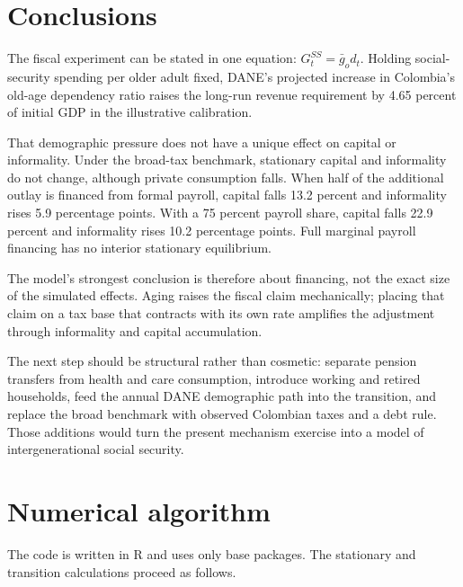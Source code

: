 \documentclass[12pt]{article}
\begin{document}
\section{Conclusions}

The fiscal experiment can be stated in one equation:
$G_t^{SS}=\bar g_o d_t$. Holding social-security spending per older adult fixed,
DANE's projected increase in Colombia's old-age dependency ratio raises the
long-run revenue requirement by 4.65 percent of initial GDP in the illustrative
calibration.

That demographic pressure does not have a unique effect on capital or
informality. Under the broad-tax benchmark, stationary capital and informality
do not change, although private consumption falls. When half of the additional
outlay is financed from formal payroll, capital falls 13.2 percent and
informality rises 5.9 percentage points. With a 75 percent payroll share,
capital falls 22.9 percent and informality rises 10.2 percentage points. Full
marginal payroll financing has no interior stationary equilibrium.

The model's strongest conclusion is therefore about financing, not the exact
size of the simulated effects. Aging raises the fiscal claim mechanically;
placing that claim on a tax base that contracts with its own rate amplifies the
adjustment through informality and capital accumulation.

The next step should be structural rather than cosmetic: separate pension
transfers from health and care consumption, introduce working and retired
households, feed the annual DANE demographic path into the transition, and
replace the broad benchmark with observed Colombian taxes and a debt rule.
Those additions would turn the present mechanism exercise into a model of
intergenerational social security.

\appendix

\section{Numerical algorithm}

The code is written in R and uses only base packages. The stationary and
transition calculations proceed as follows.
\end{document}
